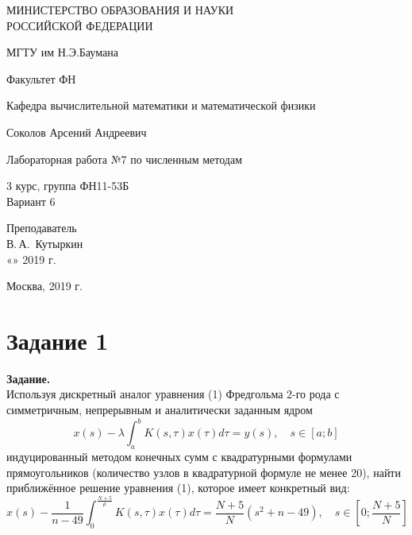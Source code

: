 \documentclass[14pt,a4paper]{scrartcl}
\begin{document}
	\begin{titlepage}
	\begin{center}
		\large
		МИНИСТЕРСТВО ОБРАЗОВАНИЯ И НАУКИ\\ РОССИЙСКОЙ ФЕДЕРАЦИИ
		
		\vspace{0.5cm}
		
		МГТУ им Н.Э.Баумана
		\vspace{0.25cm}
		
		Факультет ФН
		
		Кафедра вычислительной математики и математической физики
		\vfill
		
		
		Соколов Арсений Андреевич\\
		\vfill
		
		
		{\LARGE Лабораторная работа №7 по численным методам\\[2mm]
		}
		\bigskip
		
		3 курс, группа ФН11-53Б\\
		Вариант 6
	\end{center}
	\vfill
	
	\newlength{\ML}
	\hfill\begin{minipage}{0.4\textwidth}
		Преподаватель\\
		\underline{\hspace{3cm}} В.\,А.~Кутыркин\\
		«\underline{\hspace{0.7cm}}» \underline{\hspace{1.71cm}} 2019 г.
	\end{minipage}%
	\bigskip
	
	
	\vfill
	
	\begin{center}
		Москва, 2019 г.
	\end{center}
\end{titlepage}

\section*{Задание 1}
\textbf{Задание.}\\
Используя дискретный аналог уравнения (1) Фредгольма 2-го рода с симметричным, непрерывным и аналитически заданным ядром
\begin{equation}
	x(s)-\lambda \int_{a}^{b} K(s, \tau) x(\tau) d \tau=y(s), \quad s \in[a ; b]
\end{equation}
индуцированный методом конечных сумм с квадратурными формулами прямоугольников (количество узлов в квадратурной формуле не менее 20), найти приближённое решение уравнения (1), которое имеет конкретный вид:
\begin{equation*}
	x(s)-\frac{1}{n-49} \int_{0}^{\frac{N+5}{\mu}} K(s, \tau) x(\tau) d \tau=\frac{N+5}{N}\left(s^{2}+n-49\right), \quad s \in\left[0 ; \frac{N+5}{N}\right]
\end{equation*}
\end{document}

